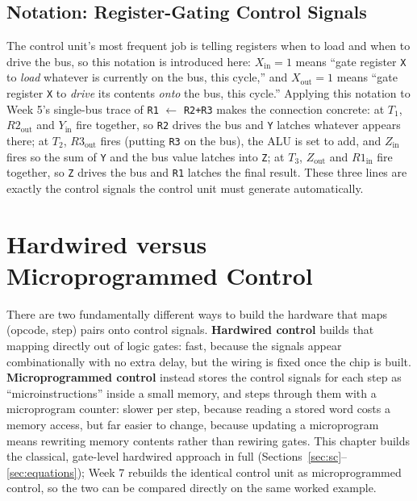 \documentclass[11pt]{article}
\begin{document}
\subsection{Notation: Register-Gating Control Signals}

The control unit's most frequent job is telling registers when to load and when to drive the bus, so this notation is introduced here: $X_{\text{in}} = 1$ means ``gate register \texttt{X} to \emph{load} whatever is currently on the bus, this cycle,'' and $X_{\text{out}} = 1$ means ``gate register \texttt{X} to \emph{drive} its contents \emph{onto} the bus, this cycle.'' Applying this notation to Week 5's single-bus trace of \texttt{R1} $\gets$ \texttt{R2+R3} makes the connection concrete: at $T_1$, $R2_{\text{out}}$ and $Y_{\text{in}}$ fire together, so \texttt{R2} drives the bus and \texttt{Y} latches whatever appears there; at $T_2$, $R3_{\text{out}}$ fires (putting \texttt{R3} on the bus), the ALU is set to add, and $Z_{\text{in}}$ fires so the sum of \texttt{Y} and the bus value latches into \texttt{Z}; at $T_3$, $Z_{\text{out}}$ and $R1_{\text{in}}$ fire together, so \texttt{Z} drives the bus and \texttt{R1} latches the final result. These three lines are exactly the control signals the control unit must generate automatically.

\section{Hardwired versus Microprogrammed Control}
\label{sec:philosophies}

There are two fundamentally different ways to build the hardware that maps (opcode, step) pairs onto control signals. \textbf{Hardwired control} builds that mapping directly out of logic gates: fast, because the signals appear combinationally with no extra delay, but the wiring is fixed once the chip is built. \textbf{Microprogrammed control} instead stores the control signals for each step as ``microinstructions'' inside a small memory, and steps through them with a microprogram counter: slower per step, because reading a stored word costs a memory access, but far easier to change, because updating a microprogram means rewriting memory contents rather than rewiring gates. This chapter builds the classical, gate-level hardwired approach in full (Sections~\ref{sec:sc}--\ref{sec:equations}); Week 7 rebuilds the identical control unit as microprogrammed control, so the two can be compared directly on the same worked example.
\end{document}
